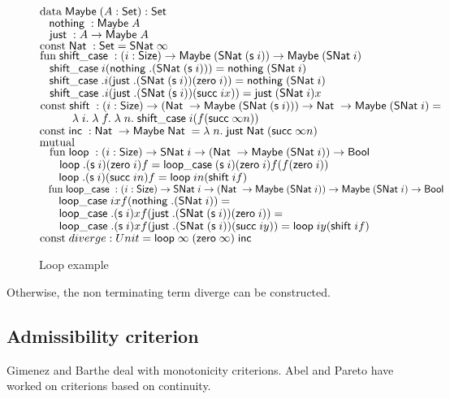 \begin{figure}
$\data \Maybe (A : \Set ) : \Set$\\
$\spc  \nothing : \Maybe A$\\
$\spc  \just : A \ra\Maybe A$\\
$\const \Nat : \Set = \SNat \infty$\\
$\fun \shiftcase : (i : \Size) \ra\Maybe (\SNat (\s i)) \ra\Maybe (\SNat i)$\\
$\spc \shiftcase i (\nothing .(\SNat (\s i))) = \nothing (\SNat i)$\\
$\spc \shiftcase .i (\just .(\SNat (\s i)) (\zero i)) = \nothing (\SNat i)$\\
$\spc \shiftcase .i (\just .(\SNat (\s i)) (\suc i x)) = \just (\SNat i) x$\\
$\const \shift : (i : \Size) \ra(\Nat \ra\Maybe (\SNat (\s i))) \ra\Nat \ra\Maybe (\SNat i) =$\\ 
$\spcx \lam{i}{\lam{f}{\lam{n}{\shiftcase i (f (\suc \infty n))}}}$\\
$\const \inc : \Nat \ra\Maybe \Nat = \lam{n}{\just \Nat (\suc \infty n)}$\\
$\mutual$\\
$\spc \fun \lop : (i : \Size ) \ra\SNat i \ra(\Nat \ra\Maybe (\SNat i)) \ra\Bool$\\
$\spc \spc \lop .(\s i) (\zero i) f = \lopcase (\s i) (\zero i) f (f (\zero i))$\\
$\spc \spc \lop .(\s i) (\suc i n) f = \lop i n (\shift i f)$\\
$\spc \fun \lopcase : (i : \Size ) \ra\SNat i \ra(\Nat \ra\Maybe (\SNat i)) \ra\Maybe (\SNat i) \ra\Bool$\\
$\spc \spc \lopcase i       x f (\nothing .(\SNat i)) = \tt$\\
$\spc \spc \lopcase .(\s i)  x f (\just .(\SNat (\s i))  (\zero i)) = \tt$\\
$\spc \spc \lopcase .(\s i)  x f (\just .(\SNat (\s i)) (\suc i y)) = \lop i y (\shift i f) $\\
$\const diverge : Unit = \lop \infty\; (\zero \infty) \; \inc$\\
\caption{Loop example}
\label{loop}
\end{figure}

Otherwise, the non terminating term diverge can be constructed.

\subsection{Admissibility criterion}
Gimenez and Barthe deal with monotonicity criterions.
Abel and Pareto have worked on criterions based on continuity.

